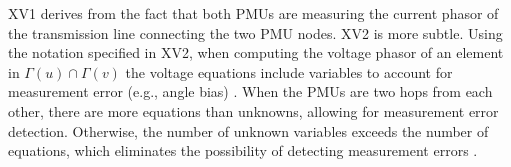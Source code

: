 XV1 derives from the fact that both PMUs are measuring the current phasor of the transmission line connecting the two PMU nodes.  XV2 is more subtle.  
Using the notation specified in XV2, when computing the voltage phasor of an element in $\Gamma(u)\cap\Gamma(v)$ the voltage equations include variables to 
account for measurement error (e.g., angle bias) \cite{Vanfretti-thesis}. 
When the PMUs are two hops from each other, there are more equations than unknowns, allowing for measurement error detection. 
Otherwise, the number of unknown variables exceeds the number of equations, which eliminates the possibility of detecting measurement errors \cite{Vanfretti-thesis}.






